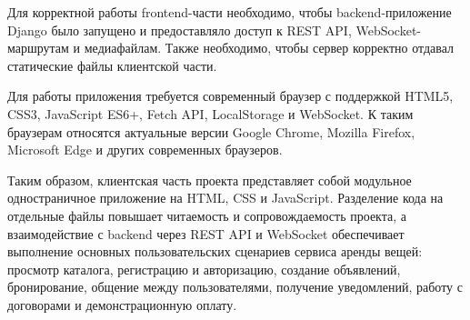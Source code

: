 Для корректной работы frontend-части необходимо, чтобы backend-приложение Django было запущено и предоставляло доступ к REST API, WebSocket-маршрутам и медиафайлам. Также необходимо, чтобы сервер корректно отдавал статические файлы клиентской части.

Для работы приложения требуется современный браузер с поддержкой HTML5, CSS3, JavaScript ES6+, Fetch API, LocalStorage и WebSocket. К таким браузерам относятся актуальные версии Google Chrome, Mozilla Firefox, Microsoft Edge и других современных браузеров.

Таким образом, клиентская часть проекта представляет собой модульное одностраничное приложение на HTML, CSS и JavaScript. Разделение кода на отдельные файлы повышает читаемость и сопровождаемость проекта, а взаимодействие с backend через REST API и WebSocket обеспечивает выполнение основных пользовательских сценариев сервиса аренды вещей: просмотр каталога, регистрацию и авторизацию, создание объявлений, бронирование, общение между пользователями, получение уведомлений, работу с договорами и демонстрационную оплату.